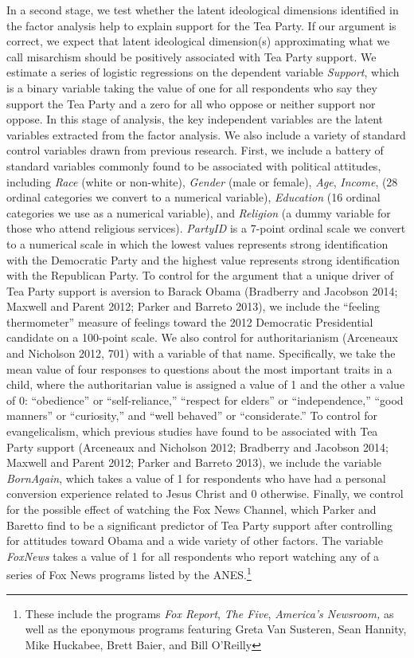 \documentclass[12pt,]{article}
\let\rmarkdownfootnote\footnote%
\def\footnote{\protect\rmarkdownfootnote}
\begin{document}
In a second stage, we test whether the latent ideological dimensions
identified in the factor analysis help to explain support for the Tea
Party. If our argument is correct, we expect that latent ideological
dimension(s) approximating what we call misarchism should be positively
associated with Tea Party support. We estimate a series of logistic
regressions on the dependent variable \emph{Support}, which is a binary
variable taking the value of one for all respondents who say they
support the Tea Party and a zero for all who oppose or neither support
nor oppose. In this stage of analysis, the key independent variables are
the latent variables extracted from the factor analysis. We also include
a variety of standard control variables drawn from previous research.
First, we include a battery of standard variables commonly found to be
associated with political attitudes, including \emph{Race} (white or
non-white), \emph{Gender} (male or female), \emph{Age}, \emph{Income},
(28 ordinal categories we convert to a numerical variable),
\emph{Education} (16 ordinal categories we use as a numerical variable),
and \emph{Religion} (a dummy variable for those who attend religious
services). \emph{PartyID} is a 7-point ordinal scale we convert to a
numerical scale in which the lowest values represents strong
identification with the Democratic Party and the highest value
represents strong identification with the Republican Party. To control
for the argument that a unique driver of Tea Party support is aversion
to Barack Obama (Bradberry and Jacobson 2014; Maxwell and Parent 2012;
Parker and Barreto 2013), we include the ``feeling thermometer'' measure
of feelings toward the 2012 Democratic Presidential candidate on a
100-point scale. We also control for authoritarianism (Arceneaux and
Nicholson 2012, 701) with a variable of that name. Specifically, we take
the mean value of four responses to questions about the most important
traits in a child, where the authoritarian value is assigned a value of
1 and the other a value of 0: ``obedience'' or ``self-reliance,''
``respect for elders'' or ``independence,'' ``good manners'' or
``curiosity,'' and ``well behaved'' or ``considerate.'' To control for
evangelicalism, which previous studies have found to be associated with
Tea Party support (Arceneaux and Nicholson 2012; Bradberry and Jacobson
2014; Maxwell and Parent 2012; Parker and Barreto 2013), we include the
variable \emph{BornAgain}, which takes a value of 1 for respondents who
have had a personal conversion experience related to Jesus Christ and 0
otherwise. Finally, we control for the possible effect of watching the
Fox News Channel, which Parker and Baretto find to be a significant
predictor of Tea Party support after controlling for attitudes toward
Obama and a wide variety of other factors. The variable \emph{FoxNews}
takes a value of 1 for all respondents who report watching any of a
series of Fox News programs listed by the ANES.\footnote{These include
  the programs \emph{Fox Report}, \emph{The Five}, \emph{America's
  Newsroom,} as well as the eponymous programs featuring Greta Van
  Susteren, Sean Hannity, Mike Huckabee, Brett Baier, and Bill O'Reilly}
\end{document}

